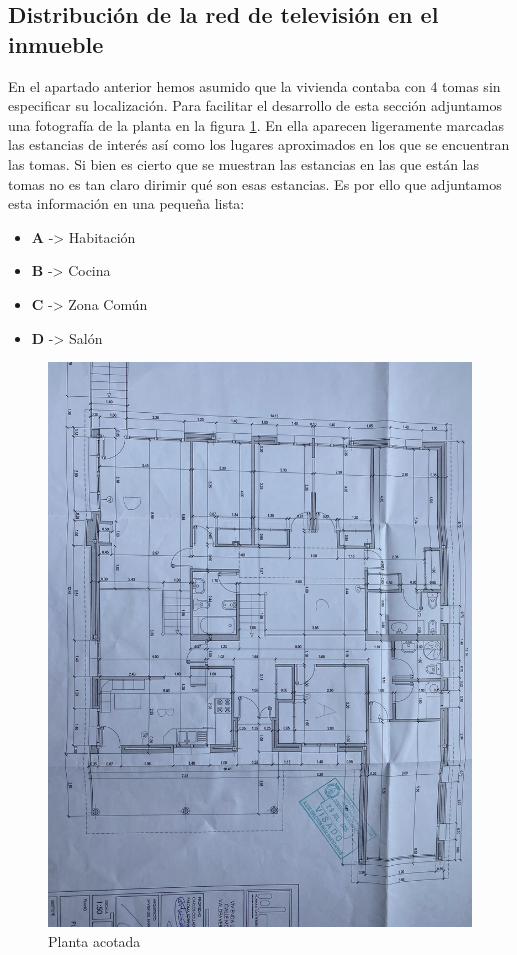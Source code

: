 \documentclass{article}[12 pt]
\begin{document}
		\subsection{Distribución de la red de televisión en el inmueble}
			En el apartado anterior hemos asumido que la vivienda contaba con $4$ tomas sin especificar su localización. Para facilitar el desarrollo de esta sección adjuntamos una fotografía de la planta en la figura \ref{f:p_acotada}. En ella aparecen ligeramente marcadas las estancias de interés así como los lugares aproximados en los que se encuentran las tomas. Si bien es cierto que se muestran las estancias en las que están las tomas no es tan claro dirimir qué son esas estancias. Es por ello que adjuntamos esta información en una pequeña lista:

			\begin{itemize}
				\item \textbf{A} -> Habitación
				\item \textbf{B} -> Cocina
				\item \textbf{C} -> Zona Común
				\item \textbf{D} -> Salón
			\end{itemize}

			\begin{figure}
				\centering
				\includegraphics[width=0.8\linewidth]{planta_acotada.jpg}
				\caption{Planta acotada}
				\label{f:p_acotada}
			\end{figure}
\end{document}
